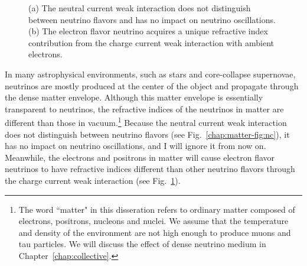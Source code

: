 \begin{figure}[htbp]
\begin{subfigure}[t]{0.40\textwidth}
    \caption{  }
    \label{chap:matter-fig:cc}
	\end{subfigure}
	\caption{
  (a) The neutral current weak interaction does not distinguish between neutrino flavors and has no impact on neutrino oscillations. (b) The electron flavor neutrino acquires a unique refractive index contribution from the charge current weak interaction with ambient electrons.
  }
    \label{chap:matter-fig:nc-cc}
\end{figure}

In many astrophysical environments, such as stars and core-collapse supernovae, neutrinos are mostly produced at the center of the object and propagate through the dense matter envelope. Although this matter envelope is essentially transparent to neutrinos, the refractive indices of the neutrinos in matter are different than those in vacuum.\footnote{The word ``matter" in this disseration refers to ordinary matter composed of electrons, positrons, nucleons and nuclei. We assume that the temperature and density of the environment are not high enough to produce muons and tau particles. We will discuss the effect of dense neutrino medium in Chapter~\ref{chap:collective}.} Because the neutral current weak interaction does not distinguish between neutrino flavors (see Fig.~\ref{chap:matter-fig:nc}), it has no impact on neutrino oscillations, and I will ignore it from now on. Meanwhile, the electrons and positrons in matter will cause electron flavor neutrinos to have refractive indices different than other neutrino flavors through the charge current weak interaction (see Fig.~\ref{chap:matter-fig:cc}).
